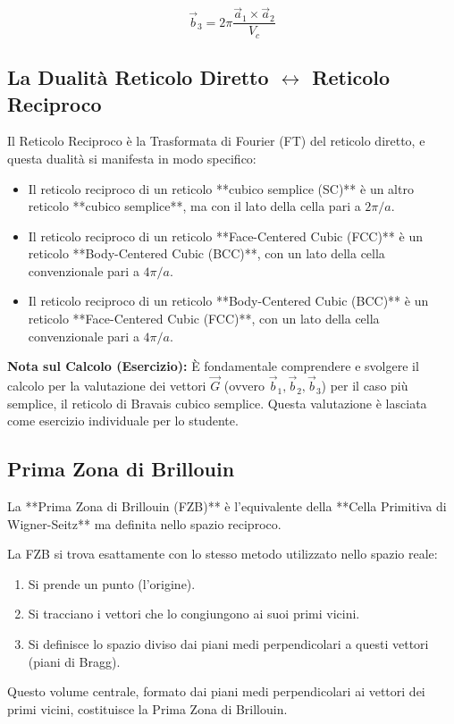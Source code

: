 \vspace{1em}
\begin{equation}
\vec{b}_3 = 2\pi \frac{\vec{a}_1 \times \vec{a}_2}{V_c}
\end{equation}
\vspace{1em}

\subsection{La Dualità Reticolo Diretto \texorpdfstring{$\leftrightarrow$}{<->} Reticolo Reciproco}

Il Reticolo Reciproco è la Trasformata di Fourier (FT) del reticolo diretto, e questa dualità si manifesta in modo specifico:

\begin{itemize}
    \item Il reticolo reciproco di un reticolo **cubico semplice (SC)** è un altro reticolo **cubico semplice**, ma con il lato della cella pari a $2\pi/a$.
    \item Il reticolo reciproco di un reticolo **Face-Centered Cubic (FCC)** è un reticolo **Body-Centered Cubic (BCC)**, con un lato della cella convenzionale pari a $4\pi/a$.
    \item Il reticolo reciproco di un reticolo **Body-Centered Cubic (BCC)** è un reticolo **Face-Centered Cubic (FCC)**, con un lato della cella convenzionale pari a $4\pi/a$.
\end{itemize}

\textbf{Nota sul Calcolo (Esercizio):}
È fondamentale comprendere e svolgere il calcolo per la valutazione dei vettori $\vec{G}$ (ovvero $\vec{b}_1, \vec{b}_2, \vec{b}_3$) per il caso più semplice, il reticolo di Bravais cubico semplice. Questa valutazione è lasciata come esercizio individuale per lo studente.

\subsection{Prima Zona di Brillouin}

La **Prima Zona di Brillouin (FZB)** è l'equivalente della **Cella Primitiva di Wigner-Seitz** ma definita nello spazio reciproco.

La FZB si trova esattamente con lo stesso metodo utilizzato nello spazio reale:
\begin{enumerate}
    \item Si prende un punto (l'origine).
    \item Si tracciano i vettori che lo congiungono ai suoi primi vicini.
    \item Si definisce lo spazio diviso dai piani medi perpendicolari a questi vettori (piani di Bragg).
\end{enumerate}
Questo volume centrale, formato dai piani medi perpendicolari ai vettori dei primi vicini, costituisce la Prima Zona di Brillouin.
